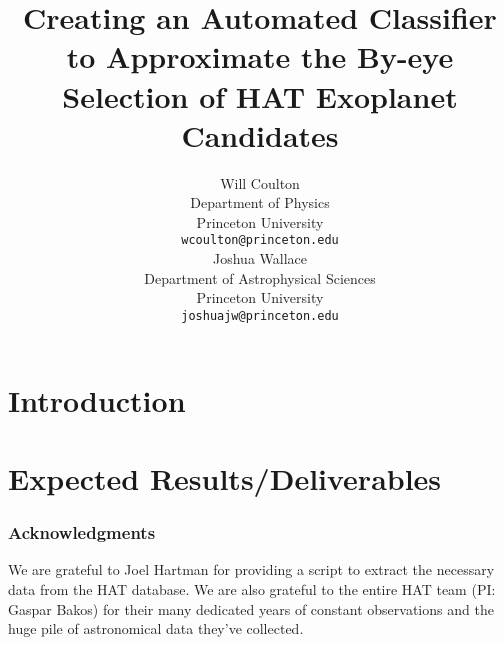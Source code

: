 \documentclass{article} %
\title{Creating an Automated Classifier to Approximate the By-eye
  Selection of HAT Exoplanet Candidates}
\author{
Will Coulton \\
Department of Physics \\
Princeton University\\
\texttt{wcoulton@princeton.edu} \\
\And
Joshua Wallace\\
Department of Astrophysical Sciences\\
Princeton University\\
\texttt{joshuajw@princeton.edu} \\
}
\begin{document}
\maketitle

\begin{abstract}

\end{abstract}

\section{Introduction}







\section{Expected Results/Deliverables}


\subsubsection*{Acknowledgments}
We are grateful to Joel Hartman for providing a script to extract the
necessary data from the HAT database.  We are also grateful to the
entire HAT team (PI: Gaspar Bakos) for their many dedicated years of
constant observations and the huge pile of astronomical data they've collected.




\end{document}
